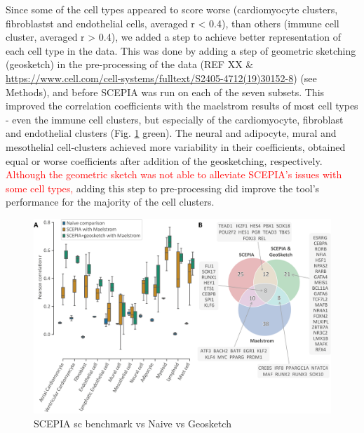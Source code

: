 Since some of the cell types appeared to score worse (cardiomyocyte clusters, fibroblastst and endothelial cells, averaged r < 0.4), than others (immune cell cluster, averaged r > 0.4), we added a step to achieve better representation of each cell type in the data. This was done by adding a step of geometric sketching (geosketch) in the pre-processing of the data (REF XX \& \href{https://www.cell.com/cell-systems/fulltext/S2405-4712(19)30152-8}{https://www.cell.com/cell-systems/fulltext/S2405-4712(19)30152-8}) (see Methods), and before SCEPIA was run on each of the seven subsets. This improved the correlation coefficients with the maelstrom results of most cell types - even the immune cell clusters, but especially of the cardiomyocyte, fibroblast and endothelial clusters (Fig. \ref{fig:sc_benchmark} green). The neural and adipocyte, mural and mesothelial cell-clusters achieved more variability in their coefficients, obtained equal or worse coefficients after addition of the geosketching, respectively. \textcolor{red}{Although the geometric sketch was not able to alleviate SCEPIA's issues with some cell types,} adding this step to pre-processing did improve the tool's performance for the majority of the cell clusters. 
\begin{figure}
    \centering
    \includegraphics[width=0.75\linewidth]{ch.scepia/imgs/Fig_OverlappingHitsBetweenSCEPIAGEOANDMAELSTROM_v7.png}
    \caption{SCEPIA sc benchmark vs Naive vs Geosketch}
    \label{fig:sc_benchmark}
\end{figure}

